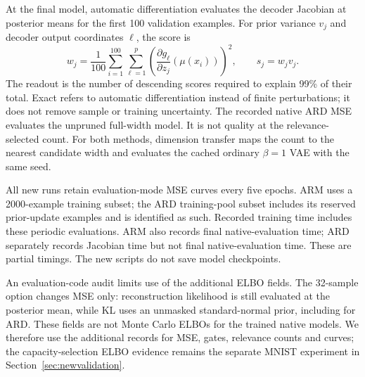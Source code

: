 At the final model, automatic differentiation evaluates the decoder
Jacobian at posterior means for the first 100 validation examples.
For prior variance $v_j$ and decoder output coordinates $\ell$, the score is
\begin{equation}
 w_j=\frac{1}{100}\sum_{i=1}^{100}\sum_{\ell=1}^{p}
 \left(\frac{\partial g_\ell}{\partial z_j}(\mu(x_i))\right)^2,
 \qquad s_j=w_jv_j.
 \label{eq:exactard}
\end{equation}
The readout is the number of descending scores required to explain
99\% of their total. Exact refers to automatic differentiation instead
of finite perturbations; it does not remove sample or training uncertainty.
The recorded native ARD MSE evaluates the unpruned full-width model.
It is not quality at the relevance-selected count. For both methods,
dimension transfer maps the count to the nearest candidate width and
evaluates the cached ordinary $\beta=1$ VAE with the same seed.

All new runs retain evaluation-mode MSE curves every five epochs.
ARM uses a 2000-example training subset; the ARD training-pool subset
includes its reserved prior-update examples and is identified as such.
Recorded training time includes these periodic evaluations. ARM also
records final native-evaluation time; ARD separately records Jacobian
time but not final native-evaluation time. These are partial timings.
The new scripts do not save model checkpoints.

An evaluation-code audit limits use of the additional ELBO fields.
The 32-sample option changes MSE only: reconstruction likelihood is still
evaluated at the posterior mean, while KL uses an unmasked standard-normal
prior, including for ARD. These fields are not Monte Carlo ELBOs for the
trained native models. We therefore use the additional records for MSE,
gates, relevance counts and curves; the capacity-selection ELBO evidence
remains the separate MNIST experiment in Section~\ref{sec:newvalidation}.

